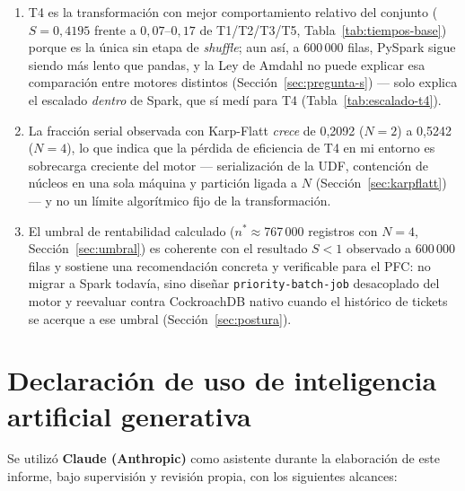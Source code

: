 \documentclass[11pt,a4paper]{article}
\begin{document}
\begin{enumerate}
\item T4 es la transformación con mejor comportamiento relativo del conjunto (\(S=0{,}4195\)
frente a \(0{,}07\)--\(0{,}17\) de T1/T2/T3/T5, Tabla~\ref{tab:tiempos-base}) porque es la única
sin etapa de \emph{shuffle}; aun así, a 600\,000 filas, PySpark sigue siendo más lento que
pandas, y la Ley de Amdahl no puede explicar esa comparación entre motores distintos
(Sección~\ref{sec:pregunta-s}) --- solo explica el escalado \emph{dentro} de Spark, que sí medí
para T4 (Tabla~\ref{tab:escalado-t4}).
\item La fracción serial observada con Karp-Flatt \emph{crece} de 0,2092 (\(N=2\)) a 0,5242
(\(N=4\)), lo que indica que la pérdida de eficiencia de T4 en mi entorno es sobrecarga
creciente del motor --- serialización de la UDF, contención de núcleos en una sola máquina y
partición ligada a \(N\) (Sección~\ref{sec:karpflatt}) --- y no un límite algorítmico fijo de la
transformación.
\item El umbral de rentabilidad calculado (\(n^{*}\approx\)767\,000 registros con \(N=4\),
Sección~\ref{sec:umbral}) es coherente con el resultado \(S<1\) observado a 600\,000 filas y
sostiene una recomendación concreta y verificable para el PFC: no migrar a Spark todavía, sino
diseñar \texttt{priority-batch-job} desacoplado del motor y reevaluar contra CockroachDB nativo
cuando el histórico de tickets se acerque a ese umbral (Sección~\ref{sec:postura}).
\end{enumerate}

\section{Declaración de uso de inteligencia artificial generativa}

Se utilizó \textbf{Claude (Anthropic)} como asistente durante la elaboración de este informe,
bajo supervisión y revisión propia, con los siguientes alcances:
\end{document}
